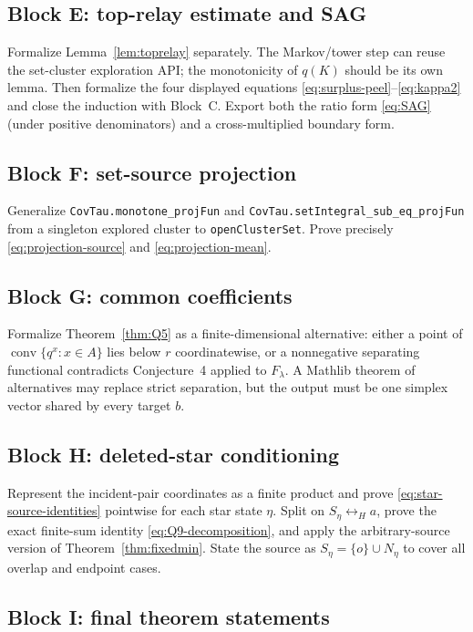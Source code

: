 \documentclass[11pt]{article}
\theoremstyle{definition}
\theoremstyle{remark}
\newcommand{\con}{\leftrightarrow}
\newcommand{\lean}[1]{\texttt{#1}}
\begin{document}
\subsection*{Block E: top-relay estimate and SAG}

Formalize Lemma~\ref{lem:toprelay} separately.  The Markov/tower step can
reuse the set-cluster exploration API; the monotonicity of $q(K)$ should
be its own lemma.  Then formalize the four displayed equations
\eqref{eq:surplus-peel}--\eqref{eq:kappa2} and close the induction with
Block~C.  Export both the ratio form \eqref{eq:SAG} (under positive
denominators) and a cross-multiplied boundary form.

\subsection*{Block F: set-source projection}

Generalize
\lean{CovTau.monotone\_projFun} and
\lean{CovTau.setIntegral\_sub\_eq\_projFun} from a singleton explored
cluster to \lean{openClusterSet}.  Prove precisely
\eqref{eq:projection-source} and \eqref{eq:projection-mean}.

\subsection*{Block G: common coefficients}

Formalize Theorem~\ref{thm:Q5} as a finite-dimensional alternative:
either a point of $\operatorname{conv}\{q^x:x\in A\}$ lies below $r$
coordinatewise, or a nonnegative separating functional contradicts
Conjecture~4 applied to $F_\lambda$.  A Mathlib theorem of alternatives
may replace strict separation, but the output must be one simplex vector
shared by every target $b$.

\subsection*{Block H: deleted-star conditioning}

Represent the incident-pair coordinates as a finite product and prove
\eqref{eq:star-source-identities} pointwise for each star state $\eta$.
Split on $S_\eta\con_H a$, prove the exact finite-sum identity
\eqref{eq:Q9-decomposition}, and apply the arbitrary-source version of
Theorem~\ref{thm:fixedmin}.  State the source as
$S_\eta=\{o\}\cup N_\eta$ to cover all overlap and endpoint cases.

\subsection*{Block I: final theorem statements}
\end{document}
